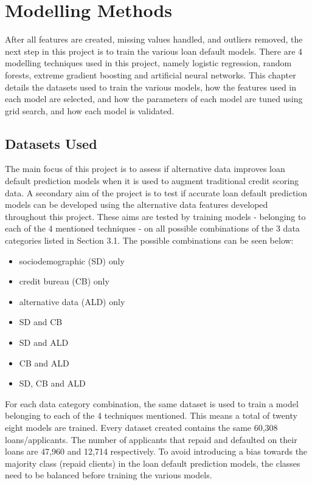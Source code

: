 \chapter{Modelling Methods} 
\label{Chapter4}

After all features are created, missing values handled, and outliers removed, the next step in this project is to train the various loan default models. There are 4 modelling techniques used in this project, namely logistic regression, random forests, extreme gradient boosting and artificial neural networks. This chapter details the datasets used to train the various models, how the features used in each model are selected, and how the parameters of each model are tuned using grid search, and how each model is validated. \\

\section{Datasets Used}

The main focus of this project is to assess if alternative data improves loan default prediction models when it is used to augment traditional credit scoring data. A secondary aim of the project is to test if accurate loan default prediction models can be developed using the alternative data features developed throughout this project. These aims are tested by training models - belonging to each of the 4 mentioned techniques - on all possible combinations of the 3 data categories listed in Section 3.1. The possible combinations can be seen below: 

\vspace{10pt}

\begin{itemize}
    \item sociodemographic (SD) only 
    \item credit bureau (CB) only 
    \item alternative data (ALD) only 
    \item SD and CB
    \item SD and ALD
    \item CB and ALD
    \item SD, CB and ALD
\end{itemize}

\vspace{10pt}

For each data category combination, the same dataset is used to train a model belonging to each of the 4 techniques mentioned. This means a total of twenty eight models are trained. Every dataset created contains the same 60,308 loans/applicants. The number of applicants that repaid and defaulted on their loans are 47,960 and 12,714 respectively. To avoid introducing a bias towards the majority class (repaid clients) in the loan default prediction models, the classes need to be balanced before training the various models. 

